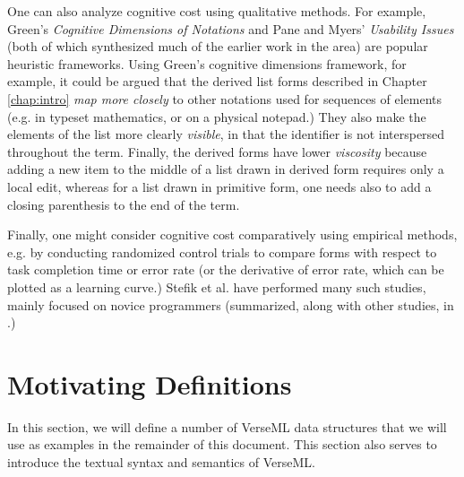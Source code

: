 One can also analyze cognitive cost using qualitative methods. For example, Green's \emph{Cognitive Dimensions of Notations} \cite{Green89,green1996usability} and Pane and Myers' \emph{Usability Issues} \cite{pane1996usability} (both of which synthesized much of the earlier work in the area) are popular heuristic frameworks. Using Green's cognitive dimensions framework, for example, it could be argued that the derived list forms described in Chapter \ref{chap:intro} \emph{map more closely} to other notations used for sequences of elements (e.g. in typeset mathematics, or on a physical notepad.) They also make the elements of the list more clearly \emph{visible}, in that the identifier  is not interspersed throughout the term. Finally, the derived forms have lower \emph{viscosity} because adding a new item to the middle of a list drawn in derived form requires only a local edit, whereas for a list drawn in primitive form, one needs also to add a closing parenthesis to the end of the term.

Finally, one might consider cognitive cost comparatively using empirical methods, e.g. by conducting randomized control trials to compare forms with respect to task completion time or error rate (or the derivative of error rate, which can be plotted as a {learning curve}.) Stefik et al. have performed many such studies, mainly focused on novice programmers (summarized, along with other studies, in \cite{journals/jeric/StefikS13}.)




\section{Motivating Definitions}\label{sec:motivating-examples}
In this section, we will define a number of VerseML data structures that we will use as examples in the remainder of this document. This section also serves to introduce the textual syntax and semantics of VerseML.

